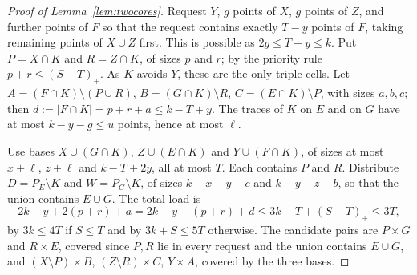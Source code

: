 \documentclass[11pt]{article}
\numberwithin{equation}{section}
\theoremstyle{definition}
\theoremstyle{remark}
\begin{document}
\begin{proof}[Proof of Lemma~\ref{lem:twocores}]
Request $Y$, $g$ points of $X$, $g$ points of $Z$, and further points of
$F$ so that the request contains exactly $T-y$ points of $F$, taking
remaining points of $X\cup Z$ first. This is possible as
$2g\le T-y\le k$. Put $P=X\cap K$ and $R=Z\cap K$, of sizes $p$ and $r$;
by the priority rule $p+r\le(S-T)_+$. As $K$ avoids $Y$, these are the
only triple cells. Let $A=(F\cap K)\setminus(P\cup R)$,
$B=(G\cap K)\setminus R$, $C=(E\cap K)\setminus P$, with sizes $a,b,c$;
then $d:=|F\cap K|=p+r+a\le k-T+y$. The traces of $K$ on $E$ and on $G$
have at most $k-y-g\le u$ points, hence at most $\ell$.

Use bases $X\cup(G\cap K)$, $Z\cup(E\cap K)$ and $Y\cup(F\cap K)$, of
sizes at most $x+\ell$, $z+\ell$ and $k-T+2y$, all at most $T$. Each
contains $P$ and $R$. Distribute $D=P_E\setminus K$ and
$W=P_G\setminus K$, of sizes $k-x-y-c$ and $k-y-z-b$, so that the union
contains $E\cup G$. The total load is
\[
 2k-y+2(p+r)+a=2k-y+(p+r)+d\le3k-T+(S-T)_+\le3T,
\]
by $3k\le4T$ if $S\le T$ and by $3k+S\le5T$ otherwise. The candidate pairs
are $P\times G$ and $R\times E$, covered since $P,R$ lie in every request
and the union contains $E\cup G$, and $(X\setminus P)\times B$,
$(Z\setminus R)\times C$, $Y\times A$, covered by the three bases.
\end{proof}
\end{document}

